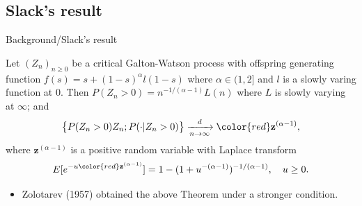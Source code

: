 \documentclass[xcolor=dvipsnames]{beamer}
\begin{document}
\subsection{Slack's result}
\begin{frame}{Background/Slack's result}
\begin{theorem}[Slack (1968)]
	Let $(Z_n)_{n\geq 0}$ be a critical Galton-Watson process with offspring generating function
$
	f(s)
	= s + (1-s)^{\alpha} l(1-s)
$
  where $\alpha \in (1,2]$ and $l$ is a slowly varing function at $0$.
  Then
$
	P(Z_n > 0) = n^{-1/(\alpha-1)} L(n)
$ 
where $L$ is slowly varying at $\infty$;
 and
\[
  \big\{ P(Z_n > 0) Z_n; P(\cdot | Z_n > 0)\big\}
	\xrightarrow[n\to \infty]{d} {\color{red}\mathbf z^{(\alpha-1)} },
\]
	where {\color{red} $\mathbf z^{(\alpha-1)}$} is a positive random variable with Laplace transform
\[
	E[e^{- u {\color{red} \mathbf z^{(\alpha-1)}} } ]
	= 1 - (1+ u^{-(\alpha-1)})^{-1/(\alpha-1)},
	\quad u \geq 0.
\]
\end{theorem}
\begin{itemize}
\item
  Zolotarev (1957) obtained the above Theorem under a stronger condition.
\end{itemize}
\end{frame}
\end{document}
